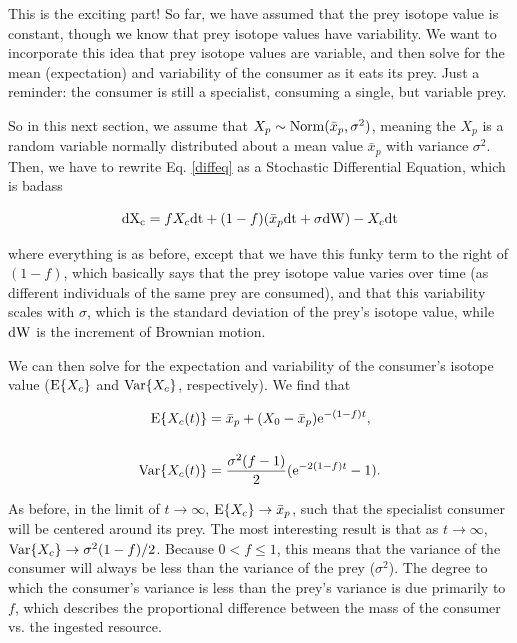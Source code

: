 \documentclass[11pt]{article}
\begin{document}
This is the exciting part! So far, we have assumed that the prey isotope value is constant, though we know that prey isotope values have variability.
We want to incorporate this idea that prey isotope values are variable, and then solve for the mean (expectation) and variability of the consumer as it eats its prey.
Just a reminder: the consumer is still a specialist, consuming a single, but variable prey.

So in this next section, we assume that $X_p \sim {\rm Norm}(\bar{x}_p,\sigma^2)$, meaning the $X_p$ is a random variable normally distributed about a mean value $\bar{x}_p$ with variance $\sigma^2$.
Then, we have to rewrite Eq. \ref{diffeq} as a Stochastic Differential Equation, which is badass

\begin{equation}
	{\rm dX_c} = fX_c{\rm dt} + (1-f)(\bar{x}_p{\rm dt} + \sigma{\rm dW}) - X_c{\rm dt}
\end{equation}

\noindent where everything is as before, except that we have this funky term to the right of $(1-f)$, which basically says that the prey isotope value varies over time (as different individuals of the same prey are consumed), and that this variability scales with $\sigma$, which is the standard deviation of the prey's isotope value, while ${\rm dW}$ is the increment of Brownian motion.

We can then solve for the expectation and variability of the consumer's isotope value (${\rm E}\{X_c\}$ and ${\rm Var}\{X_c\}$, respectively).
We find that

\begin{align}
	{\rm E}\{X_c(t)\} &= \bar{x}_p + (X_0-\bar{x}_p){\rm e}^{-(1-f)t}, \nonumber \\ \nonumber \\ 
	{\rm Var}\{X_c(t)\} &= \frac{\sigma^2(f-1)}{2}({\rm e}^{-2(1-f)t} -1).
\end{align}

\noindent As before, in the limit of $t \rightarrow \infty$, ${\rm E}\{X_c\} \rightarrow \bar{x}_p$, such that the specialist consumer will be centered around its prey.
The most interesting result is that as $t \rightarrow \infty$, ${\rm Var}\{X_c\} \rightarrow \sigma^2(1-f)/2$.
Because $0 < f \leq 1$, this means that the variance of the consumer will always be less than the variance of the prey ($\sigma^2$).
The degree to which the consumer's variance is less than the prey's variance is due primarily to $f$, which describes the proportional difference between the mass of the consumer vs. the ingested resource.
\end{document}
